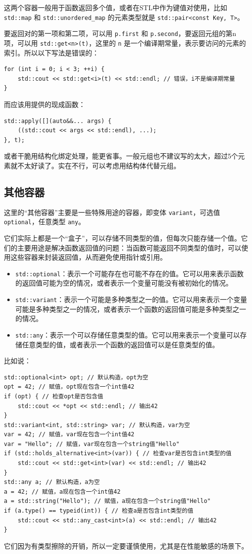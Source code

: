 这两个容器一般用于函数返回多个值，或者在STL中作为键值对使用，比如 \verb|std::map| 和 \verb|std::unordered_map| 的元素类型就是 \verb|std::pair<const Key, T>|。

要返回对的第一项和第二项，可以用 \verb|p.first| 和 \verb|p.second|，要返回元组的第n项，可以用 \verb|std::get<n>(t)|，这里的 \verb|n| 是一个编译期常量，表示要访问的元素的索引。所以以下写法是错误的：
\begin{verbatim}
for (int i = 0; i < 3; ++i) {
    std::cout << std::get<i>(t) << std::endl; // 错误，i不是编译期常量
}
\end{verbatim}
而应该用提供的现成函数：
\begin{verbatim}
std::apply([](auto&&... args) {
    ((std::cout << args << std::endl), ...);
}, t);
\end{verbatim}
或者干脆用结构化绑定处理，能更省事。一般元组也不建议写的太大，超过5个元素就不太好读了。实在不行，可以考虑用结构体代替元组。

\subsection{其他容器}

这里的“其他容器”主要是一些特殊用途的容器，即变体 \verb|variant|，可选值 \verb|optional|，任意类型 \verb|any|。

它们实际上都是一个“盒子”，可以存储不同类型的值，但每次只能存储一个值。它们的主要用途是解决函数返回值的问题：当函数可能返回不同类型的值时，可以使用这些容器来封装返回值，从而避免使用指针或引用。
\begin{itemize}
    \item \verb|std::optional|：表示一个可能存在也可能不存在的值。它可以用来表示函数的返回值可能为空的情况，或者表示一个变量可能没有被初始化的情况。
    \item \verb|std::variant|：表示一个可能是多种类型之一的值。它可以用来表示一个变量可能是多种类型之一的情况，或者表示一个函数的返回值可能是多种类型之一的情况。
    \item \verb|std::any|：表示一个可以存储任意类型的值。它可以用来表示一个变量可以存储任意类型的值，或者表示一个函数的返回值可以是任意类型的值。
\end{itemize}

比如说：
\begin{verbatim}
std::optional<int> opt; // 默认构造，opt为空
opt = 42; // 赋值，opt现在包含一个int值42
if (opt) { // 检查opt是否包含值
    std::cout << *opt << std::endl; // 输出42
}
std::variant<int, std::string> var; // 默认构造，var为空
var = 42; // 赋值，var现在包含一个int值42
var = "Hello"; // 赋值，var现在包含一个string值"Hello"
if (std::holds_alternative<int>(var)) { // 检查var是否包含int类型的值
    std::cout << std::get<int>(var) << std::endl; // 输出42
}
std::any a; // 默认构造，a为空
a = 42; // 赋值，a现在包含一个int值42
a = std::string("Hello"); // 赋值，a现在包含一个string值"Hello"
if (a.type() == typeid(int)) { // 检查a是否包含int类型的值
    std::cout << std::any_cast<int>(a) << std::endl; // 输出42
}
\end{verbatim}
它们因为有类型擦除的开销，所以一定要谨慎使用，尤其是在性能敏感的场景下。

